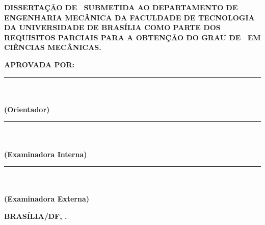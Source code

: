 \begin{folhadeaprovacao}
\begin{center}
	\vspace{10mm}
	{\large \textbf{\imprimirautor}}
\end{center}
 
\vspace{10mm}

\noindent
\MakeUppercase{\textbf{Dissertação de \imprimirtipo~submetida ao departamento de Engenharia Mecânica da Faculdade de Tecnologia da Universidade de Brasília como parte dos requisitos parciais para a obtenção do grau de \imprimirgrau~em Ciências Mecânicas.}}

\vspace{5mm}

\noindent
\MakeUppercase{\textbf{Aprovada por:}}

\vspace{10mm}

\noindent\rule{120mm}{0.1mm}\\
{\textbf{\imprimirorientador}}\\
{\textbf{\noindent (Orientador)}}

\vspace{7.5mm}

\noindent\rule{120mm}{0.1mm}\\
{\textbf{\imprimirmembroconvidadoum}}\\
{\textbf{\noindent (Examinadora Interna)}}

\vspace{7.5mm}

\noindent\rule{120mm}{0.1mm}\\
{\textbf{\imprimirmembroconvidadodois}}\\
{\textbf{\noindent (Examinadora Externa)}}



\vspace{7.5mm}
\noindent
\MakeUppercase{\textbf{Brasília/DF, \imprimirdata.}}

\pagebreak
 
\end{folhadeaprovacao}

